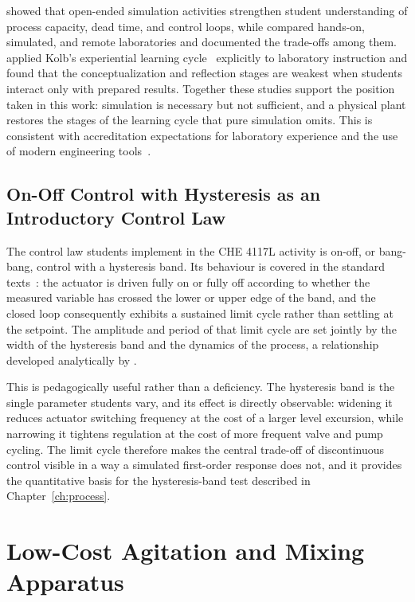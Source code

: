 \citet{zhang2013} showed that open-ended simulation activities strengthen student understanding of process capacity, dead time, and control loops, while \citet{ma2006} compared hands-on, simulated, and remote laboratories and documented the trade-offs among them. \citet{abdulwahed2009} applied Kolb's experiential learning cycle~\citep{kolb1984} explicitly to laboratory instruction and found that the conceptualization and reflection stages are weakest when students interact only with prepared results. Together these studies support the position taken in this work: simulation is necessary but not sufficient, and a physical plant restores the stages of the learning cycle that pure simulation omits. This is consistent with accreditation expectations for laboratory experience and the use of modern engineering tools~\citep{abet2024,ched2017che}.

\subsection{On-Off Control with Hysteresis as an Introductory Control Law}
\label{subsec:rrl-onoff}

The control law students implement in the CHE 4117L activity is on-off, or bang-bang, control with a hysteresis band. Its behaviour is covered in the standard texts~\citep{ogata2010,nise2020}: the actuator is driven fully on or fully off according to whether the measured variable has crossed the lower or upper edge of the band, and the closed loop consequently exhibits a sustained limit cycle rather than settling at the setpoint. The amplitude and period of that limit cycle are set jointly by the width of the hysteresis band and the dynamics of the process, a relationship developed analytically by \citet{Boiko2013}.

This is pedagogically useful rather than a deficiency. The hysteresis band is the single parameter students vary, and its effect is directly observable: widening it reduces actuator switching frequency at the cost of a larger level excursion, while narrowing it tightens regulation at the cost of more frequent valve and pump cycling. The limit cycle therefore makes the central trade-off of discontinuous control visible in a way a simulated first-order response does not, and it provides the quantitative basis for the hysteresis-band test described in Chapter~\ref{ch:process}.


\section{Low-Cost Agitation and Mixing Apparatus}
\label{sec:rrl-agitation}

